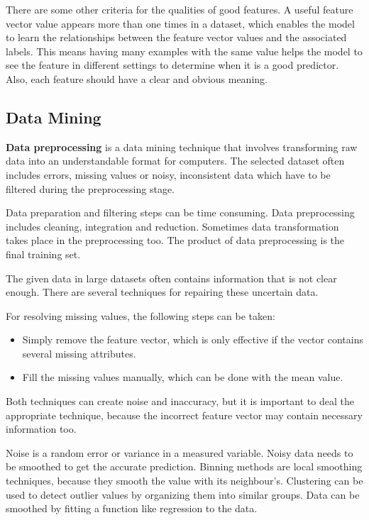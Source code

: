There are some other criteria for the qualities of good features. A useful feature vector value appears more than one times in a dataset, which enables the model to learn the relationships between the feature vector values and the associated labels. This means having many examples with the same value helps the model to see the feature in different settings to determine when it is a good predictor. Also, each feature should have a clear and obvious meaning.


\subsection{Data Mining}

\textbf{Data preprocessing} \cite{pyle1999data} is a data mining technique that involves transforming raw data into an understandable format for computers. The selected dataset often includes errors, missing values or noisy, inconsistent data which have to be filtered during the preprocessing stage. \medskip

Data preparation and filtering steps can be time consuming. Data preprocessing includes cleaning, integration and reduction. Sometimes data transformation takes place in the preprocessing too. The product of data preprocessing is the final training set.\medskip

The given data in large datasets often contains information that is not clear enough. There are several techniques for repairing these uncertain data. \bigskip

\noindent For resolving missing values, the following steps can be taken:
\begin{itemize}
	\setlength\itemsep{0em}
	\item Simply remove the feature vector, which is only effective if the vector contains several missing attributes.
	\item Fill the missing values manually, which can be done with the mean value.
\end{itemize}

Both techniques can create noise and inaccuracy, but it is important to deal the appropriate technique, because the incorrect feature vector may contain necessary information too. \bigskip

Noise is a random error or variance in a measured variable. Noisy data needs to be smoothed to get the accurate prediction. Binning methods are local smoothing techniques, because they smooth the value with its neighbour's. Clustering can be used to detect outlier values by organizing them into similar groups. Data can be smoothed by fitting a function like regression to the data.\medskip


